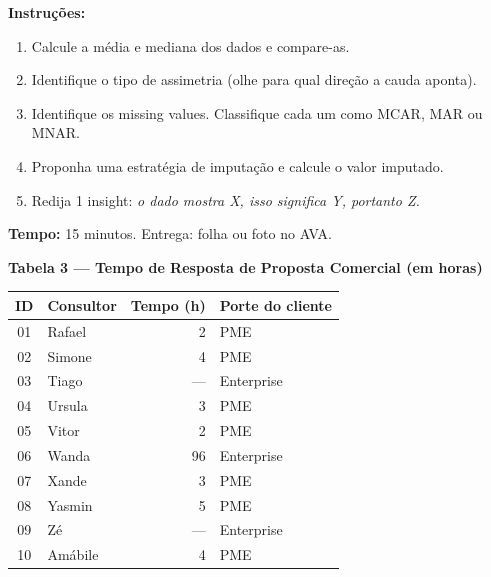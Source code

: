 \begin{SolvedBox}
\textbf{Instruções:}
\begin{enumerate}
  \item Calcule a média e mediana dos dados e compare-as.
  \item Identifique o tipo de assimetria (olhe para qual direção a cauda aponta).
  \item Identifique os missing values. Classifique cada um como MCAR, MAR ou MNAR.
  \item Proponha uma estratégia de imputação e calcule o valor imputado.
  \item Redija 1 insight: \emph{o dado mostra X, isso significa Y, portanto Z.}
\end{enumerate}
\textbf{Tempo:} 15 minutos. Entrega: folha ou foto no AVA.
\end{SolvedBox}

\begin{BoardBox}
\textbf{Tabela 3 — Tempo de Resposta de Proposta Comercial (em horas)}

\medskip
\begin{tabular}{|c|l|r|l|}
\hline
\textbf{ID} & \textbf{Consultor} & \textbf{Tempo (h)} & \textbf{Porte do cliente} \\
\hline
01 & Rafael   & 2   & PME \\
02 & Simone   & 4   & PME \\
03 & Tiago    & --- & Enterprise \\
04 & Ursula   & 3   & PME \\
05 & Vitor    & 2   & PME \\
06 & Wanda    & 96  & Enterprise \\
07 & Xande    & 3   & PME \\
08 & Yasmin   & 5   & PME \\
09 & Zé       & --- & Enterprise \\
10 & Amábile  & 4   & PME \\
\hline
\end{tabular}
\end{BoardBox}

